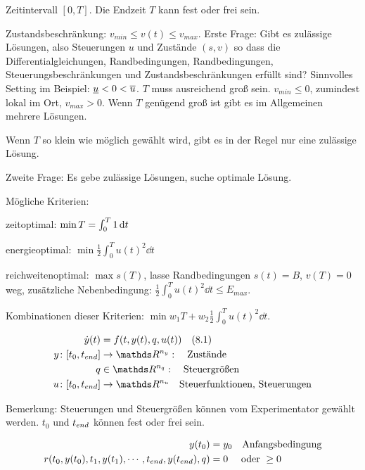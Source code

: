 Zeitintervall $[0,T]$. Die Endzeit $T$ kann fest oder frei sein.

Zustandsbeschränkung: $v_{min} \leq v(t) \leq v_{max}$. Erste Frage: Gibt es zulässige Lösungen, also Steuerungen $u$ und Zustände $(s,v)$ so dass die Differentialgleichungen, Randbedingungen, Randbedingungen, Steuerungsbeschränkungen und Zustandsbeschränkungen erfüllt sind? Sinnvolles Setting im Beispiel: $\underline u < 0 < \overline u$. $T$ muss ausreichend groß sein. $v_{min} \leq 0$, zumindest lokal im Ort, $v_{max} > 0$. Wenn $T$ genügend groß ist gibt es im Allgemeinen mehrere Lösungen.

Wenn $T$ so klein wie möglich gewählt wird, gibt es in der Regel nur eine zulässige Lösung.

Zweite Frage: Es gebe zulässige Lösungen, suche optimale Lösung.

Mögliche Kriterien:

\bitm
\item zeitoptimal: $\min T = \int_0^T 1 \,\mathrm dt$
\item energieoptimal: $\min \frac 12 \int_0^T u(t)^2 \dd t$ 
\item reichweitenoptimal: $\max s(T)$, lasse Randbedingungen $s(t)=B$, $v(T) = 0$ weg, zusätzliche Nebenbedingung: $\frac 12 \int_0^T u(t)^2 \dd t \leq E_{max}$.
\item Kombinationen dieser Kriterien: $\min w_1 T + w_2 \frac 12 \int_0^T u(t)^2 \dd t$.
\eitm



\begin{align*}
\dot y(t) &= f(t,y(t),q,u(t)) \quad (8.1) \\
y\colon [t_0, \tend] &\to \R^{n_y}: \quad \text{Zustände} \\
q & \in \R^{n_q}: \quad \text{Steuergrößen} \\
u\colon [t_0, \tend] &\to \R^{n_u} \quad \text{Steuerfunktionen, Steuerungen} \\ 
\end{align*}

Bemerkung: Steuerungen und Steuergrößen können vom Experimentator gewählt werden. $t_0$ und ${t_{end}}$ können fest oder frei sein.


\begin{align*}
y(t_0) &= y_0 \quad \text{Anfangsbedingung} \\
r(t_0, y(t_0), t_1, y(t_1), \cdots, {t_{end}}, y({t_{end}}), q) &= 0 \quad \text{ oder } \geq 0 \\
\end{align*}



